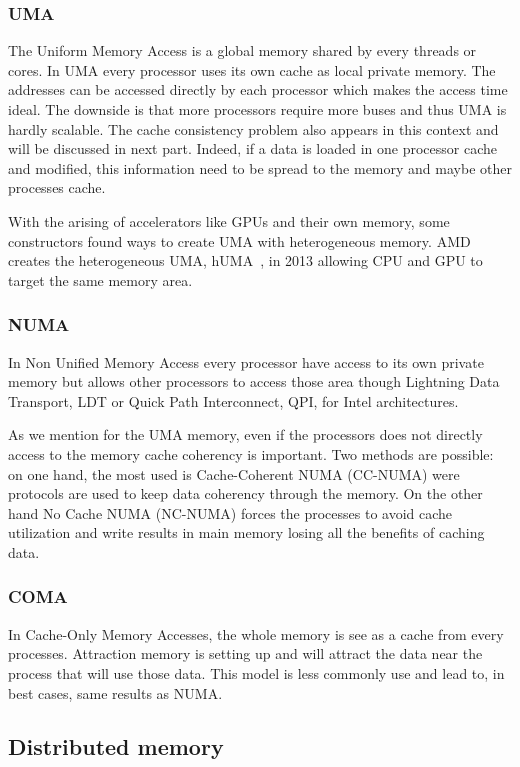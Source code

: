 \subsubsection{UMA}
The Uniform Memory Access is a global memory shared by every threads or cores. 
In UMA every processor uses its own cache as local private memory. 
The addresses can be accessed directly by each processor which makes the access time ideal. 
The downside is that more processors require more buses and thus UMA is hardly scalable. 
The cache consistency problem also appears in this context and will be discussed in next part. 
Indeed, if a data is loaded in one processor cache and modified, this information need to be spread to the memory and maybe other processes cache. 

With the arising of accelerators like GPUs and their own memory, some constructors found ways to create UMA with heterogeneous memory. 
AMD creates the heterogeneous UMA, hUMA~\cite{rogers2013amd}, in 2013 allowing CPU and GPU to target the same memory area.

\subsubsection{NUMA}

In Non Unified Memory Access every processor have access to its own private memory but allows other processors to access those area though Lightning Data Transport, LDT or Quick Path Interconnect, QPI, for Intel architectures. 

As we mention for the UMA memory, even if the processors does not directly access to the memory cache coherency is important. 
Two methods are possible: on one hand, the most used is Cache-Coherent NUMA (CC-NUMA) were protocols are used to keep data coherency through the memory. On the other hand No Cache NUMA (NC-NUMA) forces the processes to avoid cache utilization and write results in main memory losing all the benefits of caching data. 

\subsubsection{COMA}
In Cache-Only Memory Accesses, the whole memory is see as a cache from every processes.
Attraction memory is setting up and will attract the data near the process that will use those data. 
This model is less commonly use and lead to, in best cases, same results as NUMA.

\subsection{Distributed memory}

